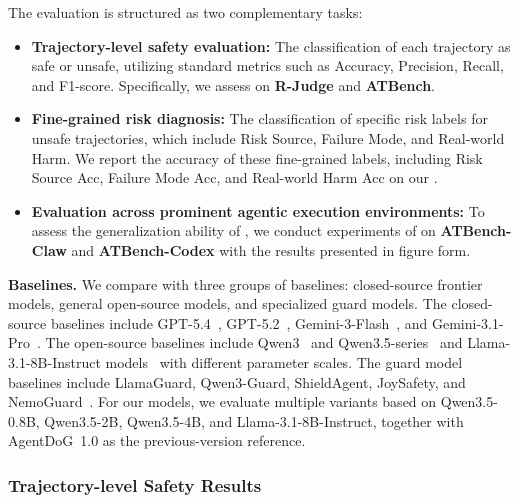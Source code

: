 The evaluation is structured as two complementary tasks:

\begin{itemize}
\item \textbf{Trajectory-level safety evaluation:} The classification of each trajectory as safe or unsafe, utilizing standard metrics such as Accuracy, Precision, Recall, and F1-score. Specifically, we assess \agentdog{} on \textbf{R-Judge} and \textbf{ATBench}.
\item \textbf{Fine-grained risk diagnosis:} The classification of specific risk labels for unsafe trajectories, which include Risk Source, Failure Mode, and Real-world Harm. We report the accuracy of these fine-grained labels, including Risk Source Acc, Failure Mode Acc, and Real-world Harm Acc on our \textbf{\toolBench{}}.
\item \textbf{Evaluation across prominent agentic execution environments:} To assess the generalization ability of \agentdog{}, we conduct experiments of \agentdog{} on \textbf{ATBench-Claw} and \textbf{ATBench-Codex} with the results presented in figure form.
\end{itemize}

\textbf{Baselines.} We compare \agentdog{} with three groups of baselines: closed-source
frontier models, general open-source models, and specialized guard models. The closed-source baselines include GPT-5.4~\citep{openai_gpt54_2026}, GPT-5.2~\citep{openai_gpt52_2025}, Gemini-3-Flash~\citep{googlecloud_gemini3flash_docs_2026}, and Gemini-3.1-Pro~\citep{gemini3}. The open-source baselines include Qwen3~\citep{qwen3} and Qwen3.5-series~\citep{qwen35} and Llama-3.1-8B-Instruct models~\citep{dubey2024llama} with different parameter scales. The guard model baselines include LlamaGuard, Qwen3-Guard, ShieldAgent, JoySafety, and NemoGuard~\citep{inan2023llama, qwen3guard2025, shieldagent2025, jd-opensource2025, nemo_guardrails2023}. For our models, we evaluate multiple \agentdog{} variants based on Qwen3.5-0.8B, Qwen3.5-2B, Qwen3.5-4B, and Llama-3.1-8B-Instruct, together with AgentDoG~1.0 as the previous-version reference.

\subsubsection{Trajectory-level Safety Results}

